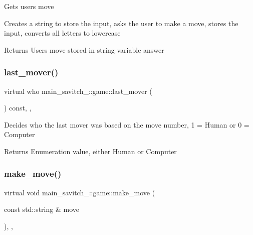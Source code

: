 Gets user\textquotesingle{}s move

Creates a string to store the input, asks the user to make a move, stores the input, converts all letters to lowercase \begin{DoxyReturn}{Returns}
User\textquotesingle{}s move stored in string variable answer 
\end{DoxyReturn}
\mbox{\label{classmain__savitch__14_1_1game_a5c1ab8b36fb977bbe9fe387e793e4ee5}} 
\subsubsection{\texorpdfstring{last\+\_\+mover()}{last\_mover()}}
{\footnotesize\ttfamily virtual who main\+\_\+savitch\+\_\+::game\+::last\+\_\+mover (\begin{DoxyParamCaption}{ }\end{DoxyParamCaption}) const\hspace{0.3cm}{\ttfamily [inline]}, {\ttfamily [protected]}, {\ttfamily [virtual]}}

Decides who the last mover was based on the move number, 1 = Human or 0 = Computer \begin{DoxyReturn}{Returns}
Enumeration value, either Human or Computer 
\end{DoxyReturn}
\mbox{\label{classmain__savitch__14_1_1game_a20597d0caa907aea47b27fed8be3759b}} 
\subsubsection{\texorpdfstring{make\+\_\+move()}{make\_move()}}
{\footnotesize\ttfamily virtual void main\+\_\+savitch\+\_\+::game\+::make\+\_\+move (\begin{DoxyParamCaption}\item[{const std\+::string \&}]{move }\end{DoxyParamCaption})\hspace{0.3cm}{\ttfamily [inline]}, {\ttfamily [protected]}, {\ttfamily [virtual]}}


